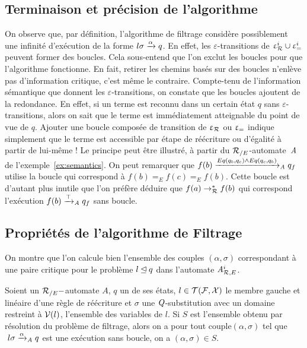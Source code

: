 \subsection{Terminaison et précision de l'algorithme}

On observe que, par définition, l'algorithme de filtrage considère possiblement
une infinité d'exécution de la forme $l\sigma \xrightarrow{\alpha} q$.
En effet, les $\varepsilon$-transitions de $\upvarepsilon_{\mathcal R}^i \cup \upvarepsilon_{=}^i$ peuvent former des boucles. 
Cela sous-entend que l'on exclut les boucles pour que l'algorithme fonctionne.
En fait, retirer les chemins basés sur des boucles n'enlève pas d'information
critique, c'est même le contraire. Compte-tenu de l'information sémantique 
que donnent les $\varepsilon$-transitions, on constate que les boucles ajoutent 
de la redondance. En effet, si un terme est reconnu dans un certain état $q$
sans $\varepsilon$-transitions, alors on sait que le terme est immédiatement atteignable 
du point de vue de $q$. Ajouter une boucle composée de transition de $\upvarepsilon_{\mathcal R}$ ou $\upvarepsilon_{=}$
indique simplement que le terme est accessible par étape de réécriture ou d'égalité
à partir de lui-même ! Le principe peut être illustré, à partir du ${\mathcal R_{/E}}$-automate~$\mathit A$
de l'exemple~\ref{ex:semantics}. On peut remarquer que $f(b) \xrightarrow{Eq(q_b, q_c)
  \land Eq(q_c, q_b)}_\mathit A q_f$ utilise la boucle qui correspond à $f(b) =_E f(c) =_E f(b)$. 
Cette boucle est d'autant plus inutile que l'on préfère déduire que $f(a) \rightarrow_\mathcal R^* f(b)$ 
qui correspond l'exécution $f(b) \xrightarrow{\top}_\mathit A q_f$ sans boucle.

\subsection{Propriétés de l'algorithme de Filtrage}

On montre que l'on calcule bien l'ensemble des couples $(\alpha,\sigma)$
correspondant à une paire critique pour le problème $l \unlhd q$ dans l'automate ${\mathit A}_{\mathcal R,E}^i$.

\begin{property}
  \label{prop:matching-complete}
  Soient un ${\mathcal R_{/E}}-$automate $A$, $q$ un de ses états, $l \in \mathcal{T(F, X)}$ le
  membre gauche et linéaire d'une règle de réécriture et $\sigma$ une
  $\mathit Q$-substitution avec un domaine restreint à $\mathcal V(l)$, l'ensemble des variables de $l$.  Si $S$
  est l'ensemble obtenu par résolution du problème de filtrage, alors on a pour
  tout couple$(\alpha, \sigma)$ tel que $\ l\sigma \xrightarrow{\alpha}_\mathit A q$ est une
  exécution sans boucle, on a $(\alpha, \sigma) \in S$.
\end{property}

